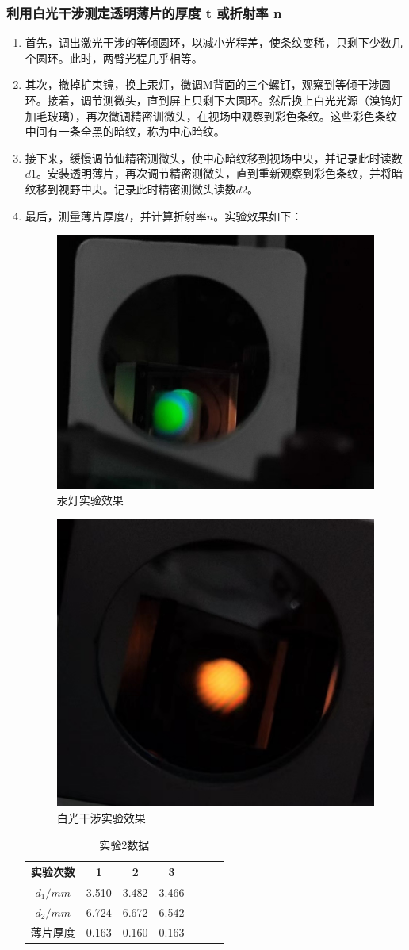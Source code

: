 \documentclass[dvipsnames, svgnames,a4paper,11pt]{article}
\begin{document}
		\subsubsection{利用白光干涉测定透明薄片的厚度 t 或折射率 n }
	\begin{enumerate}
		\item 首先，调出激光干涉的等倾圆环，以减小光程差，使条纹变稀，只剩下少数几个圆环。此时，两臂光程几乎相等。
		
		\item 其次，撤掉扩束镜，换上汞灯，微调M背面的三个螺钉，观察到等倾干涉圆环。接着，调节测微头，直到屏上只剩下大圆环。然后换上白光光源（溴钨灯加毛玻璃），再次微调精密训微头，在视场中观察到彩色条纹。这些彩色条纹中间有一条全黑的暗纹，称为中心暗纹。
		\item 接下来，缓慢调节仙精密测微头，使中心暗纹移到视场中央，并记录此时读数$d1$。安装透明薄片，再次调节精密测微头，直到重新观察到彩色条纹，并将暗纹移到视野中央。记录此时精密测微头读数$d2$。
		
		\item 最后，测量薄片厚度$t$，并计算折射率$n$。实验效果如下：
		
			\begin{figure}[H]
			\centering
			\includegraphics[width=0.3\linewidth]{images/汞灯}
			\caption{汞灯实验效果}
			\label{实验效果}
		\end{figure}
			\begin{figure}[H]
			\centering
			\includegraphics[width=0.3\linewidth]{images/白光}
			\caption{白光干涉实验效果}
			\label{白光}
		\end{figure}
		\begin{table}[H]
		\centering
		\begin{tabular}{|c|c|c|c|c|c|c|}
			\hline
			实验次数 & 1 & 2 & 3 \\ \hline
			$d_{1}/mm$  & 3.510 & 3.482 & 3.466  \\ \hline
			$d_{2}/mm$  & 6.724 & 6.672& 6.542  \\ \hline
			薄片厚度  & 0.163 & 0.160& 0.163  \\ \hline
			
		\end{tabular}
		\caption{实验2数据}
		\label{tab:experiment}
		\end{table}
		\end{enumerate}
	
\end{document}
